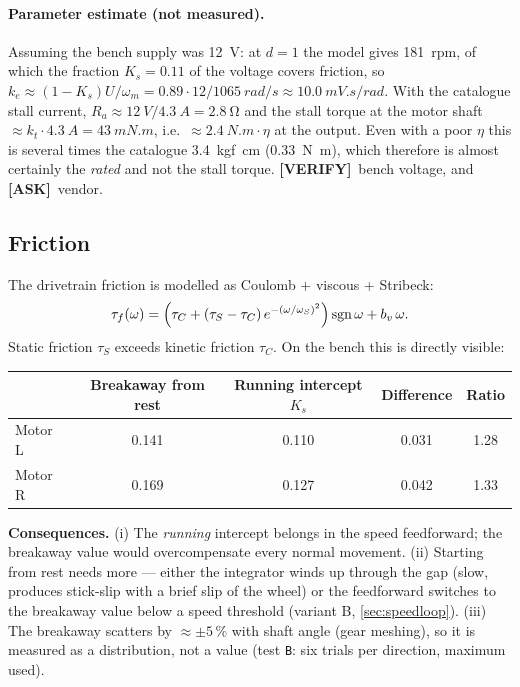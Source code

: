 \documentclass[11pt,a4paper]{article}
\newcommand{\mk}[2]{\textsf{\scriptsize\bfseries\colorbox{#1bg}{\color{#1}[#2]}}}
\newcommand{\VERIFY}{\mk{cold}{VERIFY}}
\newcommand{\ASK}{\mk{good}{ASK}}
\newcommand{\code}[1]{\texttt{\small #1}}
\newcommand{\sgn}{\operatorname{sgn}}
\begin{document}
\paragraph{Parameter estimate (not measured).} Assuming the bench supply was
\qty{12}{V}: at $d=1$ the model gives \qty{181}{rpm}, of which the fraction
$K_s=0.11$ of the voltage covers friction, so
$k_e\approx(1-K_s)U/\omega_m=0.89\cdot12/\qty{1065}{rad/s}\approx\qty{10.0}{mV.s/rad}$.
With the catalogue stall current, $R_a\approx\qty{12}{V}/\qty{4.3}{A}=\qty{2.8}{\ohm}$
and the stall torque at the motor shaft
$\approx k_t\cdot\qty{4.3}{A}=\qty{43}{mN.m}$, i.e.\ $\approx\qty{2.4}{N.m}\cdot\eta$ at the
output. Even with a poor $\eta$ this is several times the catalogue
\qty{3.4}{kgf.cm} (\qty{0.33}{N.m}), which therefore is almost certainly the
\emph{rated} and not the stall torque. \VERIFY\ bench voltage, and \ASK\ vendor.

\subsection{Friction}\label{sec:friction}

The drivetrain friction is modelled as Coulomb + viscous + Stribeck:
\begin{equation}
\tau_f(\omega)=\Bigl(\tau_C+(\tau_S-\tau_C)\,e^{-(\omega/\omega_S)^2}\Bigr)\sgn\omega + b_v\,\omega .
\end{equation}
Static friction $\tau_S$ exceeds kinetic friction $\tau_C$. On the bench this is
directly visible:

\begin{center}
\small
\begin{tabular}{@{}lcccc@{}}
\toprule
& \textbf{Breakaway from rest} & \textbf{Running intercept $K_s$} & \textbf{Difference} & \textbf{Ratio}\\
\midrule
Motor L & 0.141 & 0.110 & 0.031 & 1.28\\
Motor R & 0.169 & 0.127 & 0.042 & 1.33\\
\bottomrule
\end{tabular}
\end{center}

\textbf{Consequences.} (i) The \emph{running} intercept belongs in the speed
feedforward; the breakaway value would overcompensate every normal movement.
(ii) Starting from rest needs more --- either the integrator winds up through the
gap (slow, produces stick-slip with a brief slip of the wheel) or the
feedforward switches to the breakaway value below a speed threshold (variant B,
\cref{sec:speedloop}). (iii) The breakaway scatters by $\approx\pm5\,\%$ with
shaft angle (gear meshing), so it is measured as a distribution, not a value
(test \code{B}: six trials per direction, maximum used).
\end{document}
